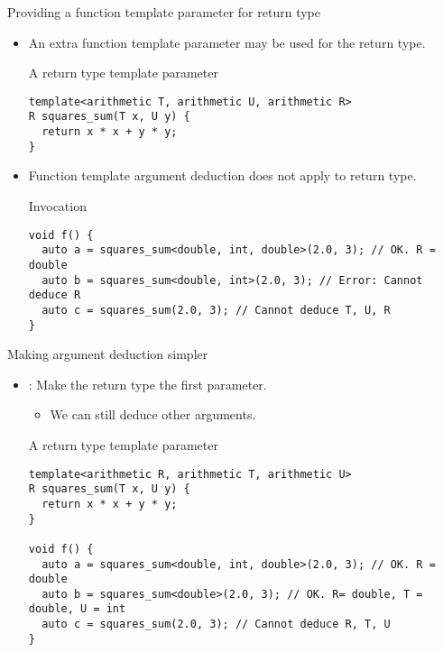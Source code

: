 \begin{frame}[t,fragile]{Providing a function template parameter for return type}

\begin{itemize}
  \item An extra function template parameter may be used for the return type.

\begin{block}{A return type template parameter}
\begin{lstlisting}
template<arithmetic T, arithmetic U, arithmetic R>
R squares_sum(T x, U y) {
  return x * x + y * y;
}
\end{lstlisting}
\end{block}

  \item Function template argument deduction does not apply to return type.

\begin{block}{Invocation}
\begin{lstlisting}
void f() {
  auto a = squares_sum<double, int, double>(2.0, 3); // OK. R = double
  auto b = squares_sum<double, int>(2.0, 3); // Error: Cannot deduce R
  auto c = squares_sum(2.0, 3); // Cannot deduce T, U, R
}
\end{lstlisting}
\end{block}

\end{itemize}
\end{frame}

\begin{frame}[t,fragile]{Making argument deduction simpler}
\begin{itemize}
  \item {}: Make the return type the first parameter.
    \begin{itemize}
      \item We can still deduce other arguments.
    \end{itemize}
\begin{block}{A return type template parameter}
\begin{lstlisting}
template<arithmetic R, arithmetic T, arithmetic U>
R squares_sum(T x, U y) {
  return x * x + y * y;
}

void f() {
  auto a = squares_sum<double, int, double>(2.0, 3); // OK. R = double
  auto b = squares_sum<double>(2.0, 3); // OK. R= double, T = double, U = int
  auto c = squares_sum(2.0, 3); // Cannot deduce R, T, U
}
\end{lstlisting}
\end{block}

\end{itemize}
\end{frame}
